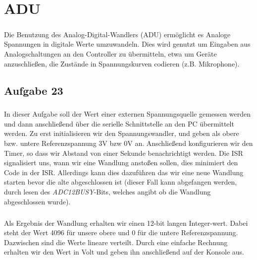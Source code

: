 \chapter{ADU}

\paragraph*{}
Die Benutzung des Analog-Digital-Wandlers (ADU) ermöglicht es Analoge Spannungen in digitale Werte umzuwandeln. Dies wird genutzt um Eingaben aus Analogschaltungen an den Controller zu übermitteln, etwa um Geräte anzuschließen, die Zustände in Spannungskurven codieren (z.B. Mikrophone).

\section*{Aufgabe 23}

\paragraph*{}
In dieser Aufgabe soll der Wert einer externen Spannungsquelle gemessen werden und dann anschließend über die serielle Schnittstelle an den PC übermittelt werden. Zu erst initialisieren wir den Spannungswandler, und geben als obere bzw. untere Referenzspannung 3V bzw 0V an. Anschließend konfigurieren wir den Timer, so dass wir Abstand von einer Sekunde benachrichtigt werden. Die ISR signalisiert uns, wann wir eine Wandlung anstoßen sollen, dies minimiert den Code in der ISR. Allerdings kann dies dazuführen das wir eine neue Wandlung starten bevor die alte abgeschlossen ist (dieser Fall kann abgefangen werden, durch lesen des {\em ADC12BUSY}-Bits, welches angibt ob die Wandlung abgeschlossen wurde).



\paragraph*{}
Als Ergebnis der Wandlung erhalten wir einen 12-bit langen Integer-wert. Dabei steht der Wert 4096 für unsere obere und 0 für die untere Referenzspannung. Dazwischen sind die Werte lineare verteilt. Durch eine einfache Rechnung erhalten wir den Wert in Volt und geben ihn anschließend auf der Konsole aus.



